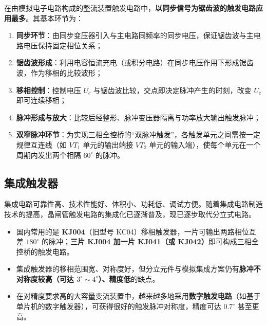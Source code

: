 在由模拟电子电路构成的整流装置触发电路中，\textbf{以同步信号为锯齿波的触发电路应用最多}。其基本环节为：

\begin{enumerate}
  \item \textbf{同步环节}：由同步变压器引入与主电路同频率的同步电压，保证锯齿波与主电路电压保持固定相位关系；
  \item \textbf{锯齿波形成}：利用电容恒流充电（或积分电路）在同步电压作用下形成锯齿波，作为移相的比较波形；
  \item \textbf{移相控制}：控制电压 $U_c$ 与锯齿波比较，交点即决定脉冲产生的时刻，改变 $U_c$ 即可连续移相；
  \item \textbf{脉冲形成与放大}：比较后经整形、脉冲变压器隔离与功率放大输出触发脉冲；
  \item \textbf{双窄脉冲环节}：为实现三相全控桥的“双脉冲触发”，各触发单元之间需按一定规律互连线（如 $VT_1$ 单元的输出端接 $VT_2$ 单元的输入端），使每个单元在一个周期内发出两个相隔 $60^\circ$ 的脉冲。
\end{enumerate}

\subsection{集成触发器}

集成电路可靠性高、技术性能好、体积小、功耗低、调试方便。随着集成电路制造技术的提高，晶闸管触发电路的集成化已逐渐普及，现已逐步取代分立式电路。

\begin{itemize}
  \item 国内常用的是 \textbf{KJ004}（旧型号 KC04）移相触发器，一片可输出两路相位互差 $180^\circ$ 的脉冲；\textbf{三片 KJ004 加一片 KJ041（或 KJ042）}即可构成三相全控桥的触发电路。
  \item 集成触发器的移相范围宽、对称度好，但分立元件与模拟集成方案仍有\textbf{脉冲不对称度较高（可达 $3^\circ\sim4^\circ$）、精度低}的缺点。
  \item 在对精度要求高的大容量变流装置中，越来越多地采用\textbf{数字触发电路}（如基于单片机的数字触发器），可获得很好的触发脉冲对称度，精度可达 $0.7^\circ$ 甚至更高。
\end{itemize}

